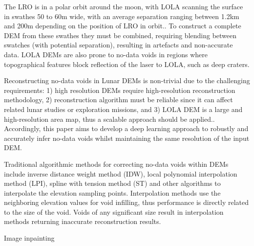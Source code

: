 \documentclass[twocolumn]{article}
\begin{document}
The LRO is in a polar orbit around the moon, with LOLA scanning the surface in swathes 50 to 60m wide, with an average separation ranging between 1.2km and 200m depending on the position of LRO in orbit.\autocite{smithLunarOrbiterLaser2010}.
To construct a complete DEM from these swathes they must be combined, requiring blending between swatches (with potential separation), resulting in artefacts and non-accurate data.
LOLA DEMs are also prone to no-data voids in regions where topographical features block reflection of the laser to LOLA, such as deep craters.

Reconstructing no-data voids in Lunar DEMs is non-trivial due to the challenging requirements: 1) high resolution DEMs require high-resolution reconstruction methodology, 2) reconstruction algorithm must be reliable since it can affect related lunar studies or exploration missions, and 3) LOLA DEM is a large and high-resolution area map, thus a scalable approach should be applied.\autocite{parkNeuralProcessApproach2021}.
Accordingly, this paper aims to develop a deep learning approach to robustly and accurately infer no-data voids whilst maintaining the same resolution of the input DEM.

Traditional algorithmic methods for correcting no-data voids within DEMs include inverse distance weight method (IDW), local polynomial interpolation method (LPI), spline with tension method (ST) and other algorithms to interpolate the elevation sampling points. Interpolation methods use the neighboring elevation values for void infilling, thus performance is directly related to the size of the void. Voids of any significant size result in interpolation methods returning inaccurate reconstruction results.  \autocite{reuterEvaluationVoidFilling2007}

Image inpainting
\printbibliography
\end{document}
